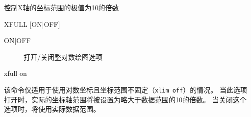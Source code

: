 \label{cmd:xfull}

控制X轴的坐标范围的极值为10的倍数

\begin{SACSTX}
XFULL [ON|OFF]
\end{SACSTX}

\begin{description}
\item [ON|OFF] 打开/关闭整对数绘图选项
\end{description}

\begin{SACDFT}
xfull on
\end{SACDFT}

该命令仅适用于使用对数坐标且坐标范围不固定（\texttt{xlim off}）的情况。
当此选项打开时，实际的坐标轴范围将被设置为略大于数据范围的10的倍数。
当关闭这个选项时，将使用实际数据范围。
